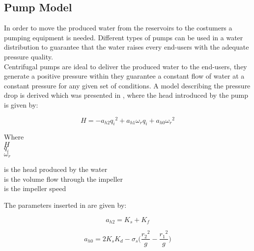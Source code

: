\subsection{Pump Model} 
\label{PumpModel}
In order to move the produced water from the reservoirs to the costumers a 
pumping equipment is needed.  Different types of pumps can be used in a water distribution to 
guarantee that the water raises every end-users with the adequate pressure 
quality.\\
Centrifugal pumps are ideal to deliver the produced water to the end-users, they 
generate a positive pressure within they guarantee a constant flow of water at a 
constant pressure for any given set of conditions. 
A model describing the pressure drop is derived which was presented in 
\cite{Phd_Carsten}, where the head introduced by the pump is given by:

\begin{equation}
  H = -a_{h2}{q_i}^2 + a_{h1} \omega_r q_i + a_{h0}{\omega_r}^2
  \label{PumpModel}
\end{equation}

\begin{minipage}[t]{0.20\textwidth}
Where\\
\hspace*{8mm} $H$ \\
\hspace*{8mm} $q_i$ \\
\hspace*{8mm} $\omega_r$ 

\end{minipage}
\begin{minipage}[t]{0.68\textwidth}
\vspace*{2mm}
is the head produced by the water\\
is the volume flow through the impeller\\
is the impeller speed
\end{minipage}

The parameters inserted in  are given by:

\begin{minipage}[t]{0.20\textwidth}
\begin{equation*}
  a_{h2} = K_s + K_f
\end{equation*}
\end{minipage}
\begin{minipage}[t]{0.68\textwidth}
\begin{equation*}
  a_{h0} = 2K_sK_d - \sigma_s 
  \bigg(\frac{{r_2}^2}{g}-\frac{{r_1}^2}{g}\bigg)
\end{equation*}
\end{minipage}

